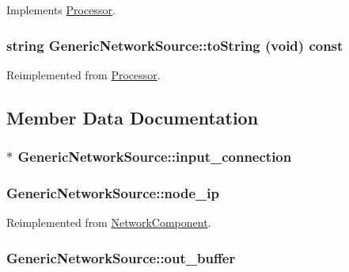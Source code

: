 Implements \hyperlink{classProcessor_495fad01358e2d9760c526d6e2db53ea}{Processor}.\hypertarget{classGenericNetworkSource_8d8c0760eb634da3ccc3d4083e9415b9}{
\subsubsection[{toString}]{\setlength{\rightskip}{0pt plus 5cm}string GenericNetworkSource::toString (void) const}}
\label{classGenericNetworkSource_8d8c0760eb634da3ccc3d4083e9415b9}




Reimplemented from \hyperlink{classProcessor_d3bdbedfbb00b05f61504e411a418106}{Processor}.

\subsection{Member Data Documentation}
\hypertarget{classGenericNetworkSource_49ae0bba9107dfecd501b5ba5ff9ddc1}{
\subsubsection[{input\_\-connection}]{$\ast$ {\bf GenericNetworkSource::input\_\-connection}}}
\label{classGenericNetworkSource_49ae0bba9107dfecd501b5ba5ff9ddc1}


\hypertarget{classGenericNetworkSource_90d400349086508bb6b2b46fbd24ed9b}{
\subsubsection[{node\_\-ip}]{ {\bf GenericNetworkSource::node\_\-ip}}}
\label{classGenericNetworkSource_90d400349086508bb6b2b46fbd24ed9b}




Reimplemented from \hyperlink{classNetworkComponent_56599b3484333fb78af1b6c33f77cf16}{NetworkComponent}.\hypertarget{classGenericNetworkSource_5d6de27fc38a82fa7efd029ab79e4ab6}{
\subsubsection[{out\_\-buffer}]{ {\bf GenericNetworkSource::out\_\-buffer}}}
\label{classGenericNetworkSource_5d6de27fc38a82fa7efd029ab79e4ab6}


